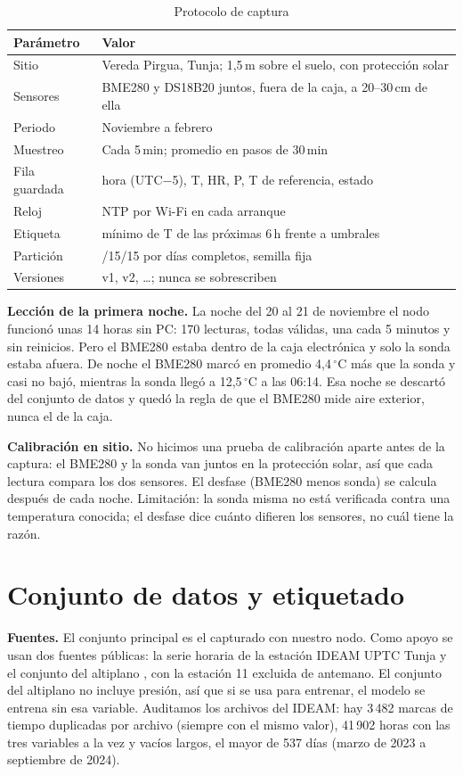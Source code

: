 \documentclass[conference]{IEEEtran}
\begin{document}
\begin{table}[t]
\caption{Protocolo de captura}
\label{tab:protocolo}
\centering
\begin{tabular}{@{}>{\raggedright}p{2.2cm}>{\raggedright\arraybackslash}p{5.6cm}@{}}
\toprule
Par\'ametro & Valor \\
\midrule
Sitio & Vereda Pirgua, Tunja; 1,5\,m sobre el suelo, con protecci\'on solar \\
Sensores & BME280 y DS18B20 juntos, fuera de la caja, a 20--30\,cm de ella \\
Periodo & Noviembre a febrero \\
Muestreo & Cada 5\,min; promedio en pasos de 30\,min \\
Fila guardada & hora (UTC$-$5), T, HR, P, T de referencia, estado \\
Reloj & NTP por Wi-Fi en cada arranque \\
Etiqueta & m\'inimo de T de las pr\'oximas 6\,h frente a umbrales \\
Partici\'on & 70/15/15 por d\'ias completos, semilla fija \\
Versiones & v1, v2, \dots; nunca se sobrescriben \\
\bottomrule
\end{tabular}
\end{table}

\textbf{Lecci\'on de la primera noche.} La noche del 20 al 21 de noviembre el nodo funcion\'o unas 14 horas sin PC: 170 lecturas, todas v\'alidas, una cada 5 minutos y sin reinicios. Pero el BME280 estaba dentro de la caja electr\'onica y solo la sonda estaba afuera. De noche el BME280 marc\'o en promedio 4,4\,$^\circ$C m\'as que la sonda y casi no baj\'o, mientras la sonda lleg\'o a 12,5\,$^\circ$C a las 06:14. Esa noche se descart\'o del conjunto de datos y qued\'o la regla de que el BME280 mide aire exterior, nunca el de la caja.

\textbf{Calibraci\'on en sitio.} No hicimos una prueba de calibraci\'on aparte antes de la captura: el BME280 y la sonda van juntos en la protecci\'on solar, as\'i que cada lectura compara los dos sensores. El desfase (BME280 menos sonda) se calcula despu\'es de cada noche. Limitaci\'on: la sonda misma no est\'a verificada contra una temperatura conocida; el desfase dice cu\'anto difieren los sensores, no cu\'al tiene la raz\'on.

\section{Conjunto de datos y etiquetado}
\textbf{Fuentes.} El conjunto principal es el capturado con nuestro nodo. Como apoyo se usan dos fuentes p\'ublicas: la serie horaria de la estaci\'on IDEAM UPTC Tunja \cite{ideam_data} y el conjunto del altiplano \cite{zenodo2026}, con la estaci\'on 11 excluida de antemano. El conjunto del altiplano no incluye presi\'on, as\'i que si se usa para entrenar, el modelo se entrena sin esa variable. Auditamos los archivos del IDEAM: hay 3\,482 marcas de tiempo duplicadas por archivo (siempre con el mismo valor), 41\,902 horas con las tres variables a la vez y vac\'ios largos, el mayor de 537 d\'ias (marzo de 2023 a septiembre de 2024).
\end{document}
